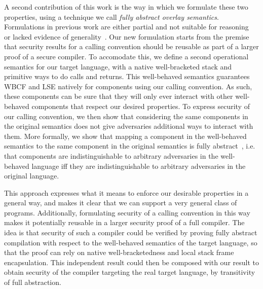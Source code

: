 \documentclass[acmsmall,review,anonymous]{acmart}\settopmatter{printfolios=true,printccs=false,printacmref=false}
\begin{document}
A second contribution of this work is the way in which we formulate these two properties, using a technique we call {\itshape fully abstract overlay semantics}.
Formulations in previous work are either partial and not suitable for reasoning~\cite{abadi_control-flow_2005} or lacked evidence of generality~\cite{skorstengaard_reasoning_2017}.
Our new formulation starts from the premise that security results for a calling convention should be reusable as part of a larger proof of a secure compiler.
To accomodate this, we define a second operational semantics for our target language, with a native well-bracketed stack and primitive ways to do calls and returns.
This well-behaved semantics guarantees WBCF and LSE natively for components using our calling convention.
As such, these components can be sure that they will only ever interact with other well-behaved components that respect our desired properties.
To express security of our calling convention, we then show that considering the same components in the original semantics does not give adversaries additional ways to interact with them. 
More formally, we show that mapping a component in the well-behaved semantics to the same component in the original semantics is fully abstract~\cite{abadi_protection_1999}, i.e. that components are indistinguishable to arbitrary adversaries in the well-behaved language iff they are indistinguishable to arbitrary adversaries in the original language.

This approach expresses what it means to enforce our desirable properties in a general way, and makes it clear that we can support a very general class of programs.
Additionally, formulating security of a calling convention in this way makes it potentially reusable in a larger security proof of a full compiler.
The idea is that security of such a compiler could be verified by proving fully abstract compilation with respect to the well-behaved semantics of the target language, so that the proof can rely on native well-bracketedness and local stack frame encapsulation.
This independent result could then be composed with our result to obtain security of the compiler targeting the real target language, by transitivity of full abstraction.


\end{document}
